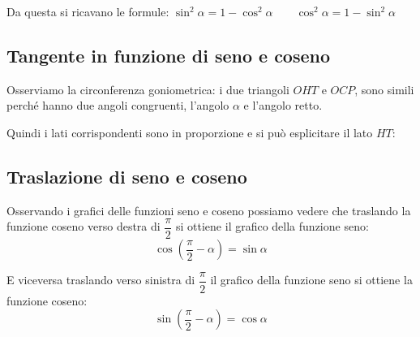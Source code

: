 Da questa si ricavano le formule:
\(\sin^2 \alpha = 1 - \cos^2 \alpha \qquad 
  \cos^2 \alpha = 1 - \sin^2 \alpha\)

\subsection{Tangente in funzione di seno e coseno}

Osserviamo la circonferenza goniometrica: 
i due triangoli \(OHT\) e \(OCP\), sono simili perché hanno due angoli 
congruenti, l'angolo \(\alpha\) e l'angolo retto. 

Quindi i lati corrispondenti sono in proporzione e si può esplicitare 
il lato \(HT\):


\subsection{Traslazione di seno e coseno}

Osservando i grafici delle funzioni seno e coseno possiamo vedere che 
traslando la funzione coseno verso destra di \(\dfrac{\pi}{2}\) si ottiene il 
grafico della funzione seno:
\[\cos\left(\frac{\pi}{2}-\alpha\right)=\sin\alpha\]
\vspace{-6mm}
  \begin{center}
\begin{inaccessibleblock}
    
\end{inaccessibleblock}
  \end{center}
\vspace{-6pt}
E viceversa traslando verso sinistra di \(\dfrac{\pi}{2}\) il grafico della 
funzione seno si ottiene la funzione coseno:
\[\sin\left(\frac{\pi}{2}-\alpha\right)=\cos\alpha\]

